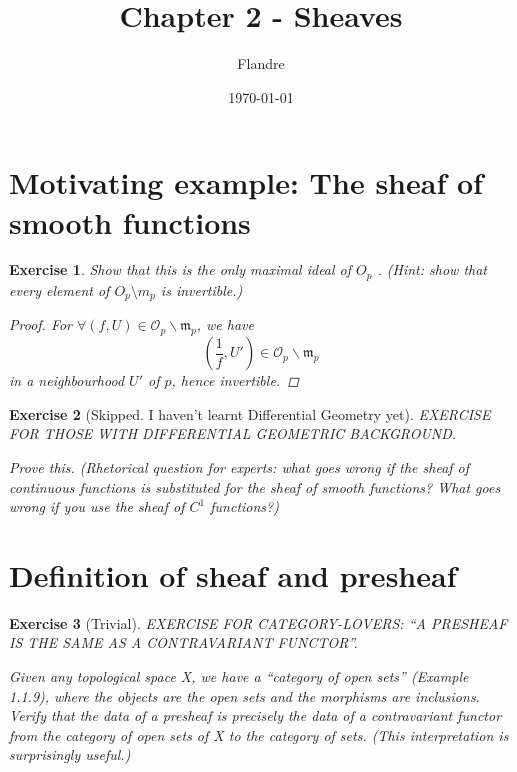 \documentclass{article}
\title{Chapter 2 - Sheaves}
\author{Flandre}
\date{\today}
\theoremstyle{breakstyle}
\newtheorem{exercise}{Exercise}[section]
\begin{document}
\maketitle

\section{Motivating example: The sheaf of smooth functions}

\begin{exercise}
Show that this is the only maximal ideal of $O_{p}$ . (Hint: show that every
element of $O_{p} \setminus m_{p}$ is invertible.)

\begin{proof}
    For $\forall \left( f,U \right) \in \mathscr{O}_{p}\backslash
    \mathfrak{m}_{p}$, we have
    $$
    \left( \frac{1}{f}, U'\right)\in \mathscr{O}_{p}\backslash \mathfrak{m}_{p}
    $$
    in a neighbourhood $U'$ of $p$, hence invertible.
\end{proof}

\end{exercise}

\begin{exercise}[Skipped. I haven't learnt Differential Geometry yet]
EXERCISE FOR THOSE WITH DIFFERENTIAL GEOMETRIC BACKGROUND.

Prove this. (Rhetorical question for experts: what goes wrong if the sheaf of
continuous functions is substituted for the sheaf of smooth functions? What goes
wrong if you use the sheaf of $C^{1}$ functions?)
\end{exercise}

\section{Definition of sheaf and presheaf}

\begin{exercise}[Trivial]
EXERCISE FOR CATEGORY-LOVERS: “A PRESHEAF IS THE SAME AS A CONTRAVARIANT
FUNCTOR”.

Given any topological space X, we have a “category of open sets” (Example
1.1.9), where the objects are the open sets and the morphisms are inclusions.
Verify that the data of a presheaf is precisely the data of a contravariant
functor from the category of open sets of X to the category of sets. (This
interpretation is surprisingly useful.)  
\end{exercise}
\end{document}
